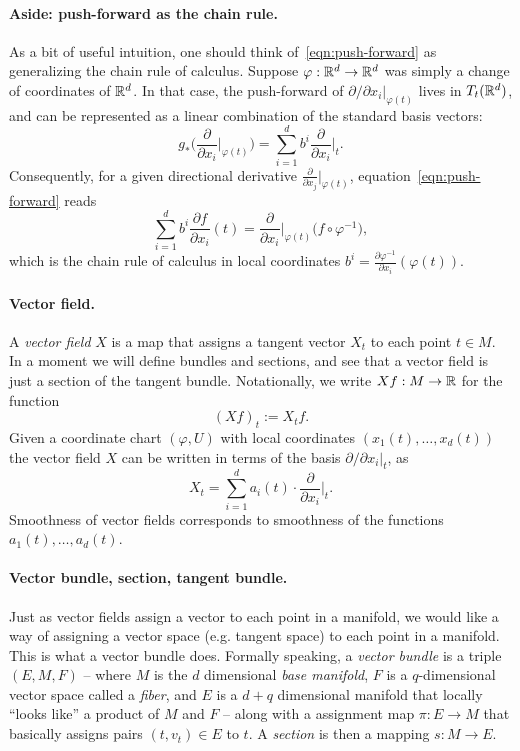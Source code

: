 \documentclass{article}
\begin{document}
	\paragraph{Aside: push-forward as the chain rule.} As a bit of useful intuition, one should think of~\eqref{eqn:push-forward} as generalizing the chain rule of calculus. Suppose $\varphi:\mathbb{R}^d \to \mathbb{R}^d$ was simply a change of coordinates of $\mathbb{R}^d$. In that case, the push-forward of $\partial/\partial x_i|_{\varphi(t)}$ lives in $T_{t}(\mathbb{R}^d)$, and can be represented as a linear combination of the standard basis vectors:
	\begin{equation*}
		g_{\ast}\Big(\frac{\partial}{\partial x_i}\Big|_{\varphi(t)}\Big) = \sum_{i = 1}^{d} b^i \frac{\partial}{\partial x_i}\Big|_{t}.
	\end{equation*}
	Consequently, for a given directional derivative $\frac{\partial}{\partial x_j}|_{\varphi(t)}$, equation~\eqref{eqn:push-forward} reads
	\begin{equation*}
		\sum_{i = 1}^{d} b^i \frac{\partial f}{\partial x_i}(t) = \frac{\partial}{\partial x_i}\Big|_{\varphi(t)}\big(f \circ \varphi^{-1}\big),
	\end{equation*}
	which is the chain rule of calculus in local coordinates $b^i = \frac{\partial \varphi^{-1}}{\partial x_i}(\varphi(t))$. 
	
	\paragraph{Vector field.}
	A \emph{vector field} $X$ is a map that assigns a tangent vector $X_t$ to each point $t \in M$. In a moment we will define bundles and sections, and see that a vector field is just a section of the tangent bundle. Notationally, we write $Xf: M \to \mathbb{R}$ for the function 
	\begin{equation*}
		(Xf)_{t} := X_tf.
	\end{equation*}
	Given a coordinate chart $(\varphi,U)$ with local coordinates $(x_1(t),\ldots,x_d(t))$ the vector field $X$ can be written in terms of the basis $\partial/\partial x_i|_{t}$, as 
	\begin{equation*}
		X_t = \sum_{i = 1}^{d} a_i(t) \cdot \frac{\partial}{\partial x_i} \Big|_{t}. 
	\end{equation*}
	Smoothness of vector fields corresponds to smoothness of the functions $a_1(t),\ldots,a_d(t)$.
	
	\paragraph{Vector bundle, section, tangent bundle.} 
	Just as vector fields assign a vector to each point in a manifold, we would like a way of assigning a vector space (e.g. tangent space) to each point in a manifold. This is what a vector bundle does.  Formally speaking, a \emph{vector bundle} is a triple $(E,M,F)$ -- where $M$ is the $d$ dimensional \emph{base manifold}, $F$ is a $q$-dimensional vector space called a \emph{fiber}, and $E$ is a $d + q$ dimensional manifold that locally ``looks like'' a product of $M$ and $F$ -- along with a assignment map $\pi: E \to M$ that basically assigns pairs $(t,v_t) \in E$ to $t$.  A \emph{section} is then a mapping $s: M \to E$.
	
\end{document}
